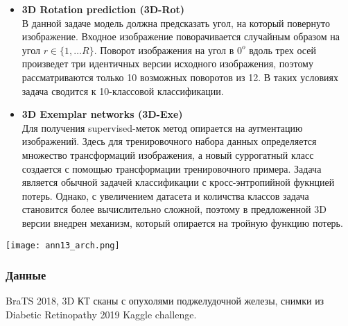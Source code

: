 \begin{itemize}
    \item \textbf{3D Rotation prediction (3D-Rot)} \\
    В данной задаче модель должна предсказать угол, на который повернуто изображение.
    Входное изображение поворачивается случайным образом на угол \(r\in \{1, \dots R\}\).
    Поворот изображения на угол в \(0^{o}\) вдоль трех осей произведет три идентичных версии
    исходного изображения, поэтому рассматриваются только 10 возможных поворотов из 12. 
    В таких условиях задача сводится к 10-классовой классификации.

    \item \textbf{3D Exemplar networks (3D-Exe)} \\
    Для получения supervised-меток метод опирается на аугментацию изображений. 
    Здесь для тренировочного набора данных определяется множество трансформаций 
    изображения, а новый суррогатный класс создается с помощью трансформации тренировочного 
    примера. Задача является обычной задачей классификации с кросс-энтропийной фукнцией потерь.
    Однако, с увеличением датасета и количства классов задача становится более вычислительно сложной, 
    поэтому в предложенной 3D версии внедрен механизм, который опирается на тройную
    функцию потерь.
\end{itemize}


\begin{minipage}{1.0\linewidth}
    \begin{center}
        \texttt{[image: ann13\_arch.png]} 
    \end{center}
    
\end{minipage}

\subsubsection*{Данные}
BraTS 2018, 3D КТ сканы с опухолями поджелудочной железы, снимки из Diabetic Retinopathy 2019 Kaggle
challenge.
